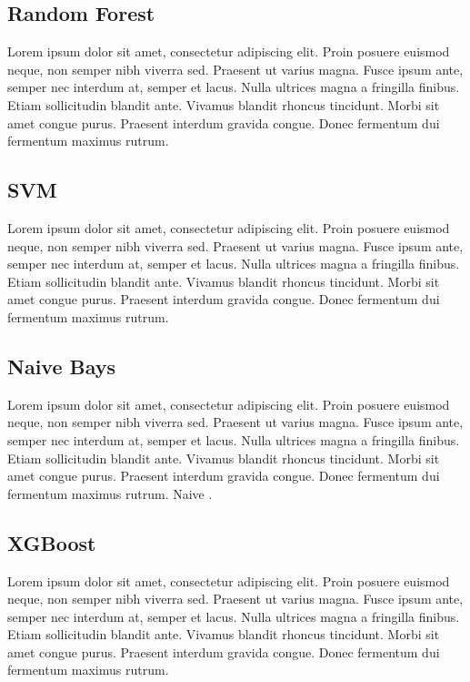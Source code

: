 \subsection{Random Forest}
\label{app:random-forest}
Lorem ipsum dolor sit amet, consectetur adipiscing elit. Proin posuere euismod neque, non semper nibh viverra sed. Praesent ut varius magna. Fusce ipsum ante, semper nec interdum at, semper et lacus. Nulla ultrices magna a fringilla finibus. Etiam sollicitudin blandit ante. Vivamus blandit rhoncus tincidunt. Morbi sit amet congue purus. Praesent interdum gravida congue. Donec fermentum dui fermentum maximus rutrum.

\subsection{SVM}
\label{app:svm}
Lorem ipsum dolor sit amet, consectetur adipiscing elit. Proin posuere euismod neque, non semper nibh viverra sed. Praesent ut varius magna. Fusce ipsum ante, semper nec interdum at, semper et lacus. Nulla ultrices magna a fringilla finibus. Etiam sollicitudin blandit ante. Vivamus blandit rhoncus tincidunt. Morbi sit amet congue purus. Praesent interdum gravida congue. Donec fermentum dui fermentum maximus rutrum.
\subsection{Naive Bays}
\label{app:naive-bays}
Lorem ipsum dolor sit amet, consectetur adipiscing elit. Proin posuere euismod neque, non semper nibh viverra sed. Praesent ut varius magna. Fusce ipsum ante, semper nec interdum at, semper et lacus. Nulla ultrices magna a fringilla finibus. Etiam sollicitudin blandit ante. Vivamus blandit rhoncus tincidunt. Morbi sit amet congue purus. Praesent interdum gravida congue. Donec fermentum dui fermentum maximus rutrum. \og Naive \fg.

\subsection{XGBoost}
\label{app:xgboost}
Lorem ipsum dolor sit amet, consectetur adipiscing elit. Proin posuere euismod neque, non semper nibh viverra sed. Praesent ut varius magna. Fusce ipsum ante, semper nec interdum at, semper et lacus. Nulla ultrices magna a fringilla finibus. Etiam sollicitudin blandit ante. Vivamus blandit rhoncus tincidunt. Morbi sit amet congue purus. Praesent interdum gravida congue. Donec fermentum dui fermentum maximus rutrum.


